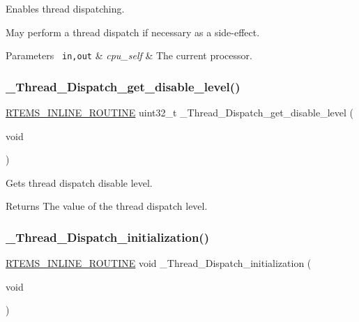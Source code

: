 Enables thread dispatching. 

May perform a thread dispatch if necessary as a side-\/effect.


\begin{DoxyParams}[1]{Parameters}
\mbox{\texttt{ in,out}}  & {\em cpu\+\_\+self} & The current processor. \\
\hline
\end{DoxyParams}
\mbox{\label{group__RTEMSScoreThread_ga3f098a76c363d6d1daff302c5d7a9d9b}} 
\subsubsection{\texorpdfstring{\_Thread\_Dispatch\_get\_disable\_level()}{\_Thread\_Dispatch\_get\_disable\_level()}}
{\footnotesize\ttfamily \mbox{\hyperlink{group__RTEMSScoreBaseDefs_gac216239df231d5dbd15e3520b0b9313f}{R\+T\+E\+M\+S\+\_\+\+I\+N\+L\+I\+N\+E\+\_\+\+R\+O\+U\+T\+I\+NE}} uint32\+\_\+t \+\_\+\+Thread\+\_\+\+Dispatch\+\_\+get\+\_\+disable\+\_\+level (\begin{DoxyParamCaption}\item[{void}]{ }\end{DoxyParamCaption})}



Gets thread dispatch disable level. 

\begin{DoxyReturn}{Returns}
The value of the thread dispatch level. 
\end{DoxyReturn}
\mbox{\label{group__RTEMSScoreThread_gae1b097ce535f591840d891f691812759}} 
\subsubsection{\texorpdfstring{\_Thread\_Dispatch\_initialization()}{\_Thread\_Dispatch\_initialization()}}
{\footnotesize\ttfamily \mbox{\hyperlink{group__RTEMSScoreBaseDefs_gac216239df231d5dbd15e3520b0b9313f}{R\+T\+E\+M\+S\+\_\+\+I\+N\+L\+I\+N\+E\+\_\+\+R\+O\+U\+T\+I\+NE}} void \+\_\+\+Thread\+\_\+\+Dispatch\+\_\+initialization (\begin{DoxyParamCaption}\item[{void}]{ }\end{DoxyParamCaption})}



